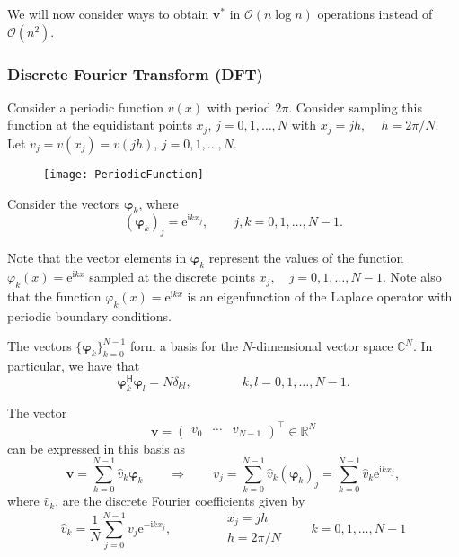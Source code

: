We will now consider ways to obtain $\bm v^*$ in $\mathcal{O}(n \log n)$
operations instead of $\mathcal{O}(n^2)$.

\subsubsection{Discrete Fourier Transform (DFT)}

Consider a periodic function $v(x)$ with period $2 \pi$. Consider sampling this
function at the equidistant points $x_j$, $j=0,1,\ldots,N$ with $x_j=j h$,
$\quad h=2 \pi / N$. Let $v_j = v(x_j) = v(j h)$, $j=0,1,\ldots,N$.
\begin{figure}[h]
  \centering
  \texttt{[image: PeriodicFunction]}
\end{figure}

Consider the vectors $\bm \varphi_k$, where
\begin{equation*}
  (\bm \varphi_k)_j = \text{e}^{\text{i} k x_j}, \qquad j,k=0,1,\ldots,N-1.
\end{equation*}

Note that the vector elements in $\bm \varphi_k$ represent the values of the
function $\varphi_k(x) = \text{e}^{\text{i}kx}$ sampled at the discrete points
$x_j, \quad j=0,1,\ldots,N-1$. Note also that the function $\varphi_k(x) =
\text{e}^{\text{i}kx}$ is an eigenfunction of the Laplace operator with periodic
boundary conditions.

The vectors $\{ \bm \varphi_k \}_{k=0}^{N-1}$ form a basis for the
$N$-dimensional vector space $\mathbb{C}^N$. In particular, we have that
\begin{equation*}
  \bm \varphi_k^\mathsf{H} \bm \varphi_l = N\delta_{kl},
  \qquad \qquad k,l=0,1,\ldots,N-1.
\end{equation*}

The vector
\begin{equation*}
  \bm v =
  \begin{pmatrix}
    v_0 & \cdots & v_{N-1}
  \end{pmatrix}^\intercal
  \in \mathbb{R}^N
\end{equation*}
can be expressed in this basis as
\begin{equation*}
  \bm v = \sum_{k=0}^{N-1} \hat{v}_k \bm \varphi_k \qquad \Rightarrow \qquad
  v_j = \sum_{k=0}^{N-1} \hat{v}_k (\bm \varphi_k)_j
        = \sum_{k=0}^{N-1} \hat{v}_k \text{e}^{\text{i} k x_j},
\end{equation*}
where $\hat{v}_k$, are the discrete Fourier coefficients given by
\begin{equation*}
  \hat{v}_k = \frac{1}{N} \sum_{j=0}^{N-1} v_j \text{e}^{-\text{i}k x_j}, \qquad \qquad
  \begin{matrix}
    x_j = j h \\
    h = 2\pi / N
  \end{matrix}
  \qquad k=0,1,\ldots,N-1
\end{equation*}

